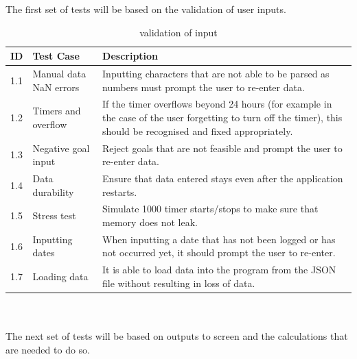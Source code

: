 \documentclass[12pt,a4paper]{article}
\begin{document}
The first set of tests will be based on the validation of user inputs.
\begin{table}[h]
    \centering
    \renewcommand{\arraystretch}{1.3} %
    \begin{tabular}{|l|l|p{9cm}|}
        \hline
        \textbf{ID} & \textbf{Test Case} & \textbf{Description} \\
        \hline
        1.1 & Manual data NaN errors  & Inputting characters that are not able to be parsed as numbers must prompt the user to re-enter data.\\
        \hline
        1.2 & Timers and overflow & If the timer overflows beyond 24 hours (for example in the case of the user forgetting to turn off the timer), this should be recognised and fixed appropriately.\\
        \hline
        1.3 & Negative goal input & Reject goals that are not feasible and prompt the user to re-enter data.\\
        \hline
        1.4 & Data durability & Ensure that data entered stays even after the application restarts.\\
        \hline
        1.5 & Stress test & Simulate 1000 timer starts/stops to make sure that memory does not leak.\\
        \hline
        1.6 & Inputting dates & When inputting a date that has not been logged or has not occurred yet, it should prompt the user to re-enter.\\
        \hline
        1.7 & Loading data & It is able to load data into the program from the JSON file without resulting in loss of data.\\
        \hline
    \end{tabular}
    \caption{validation of input}
    \label{tab:input_tests}
\end{table}
\\
\\
The next set of tests will be based on outputs to screen and the calculations that are needed to do so.
\\
\\
\end{document}
